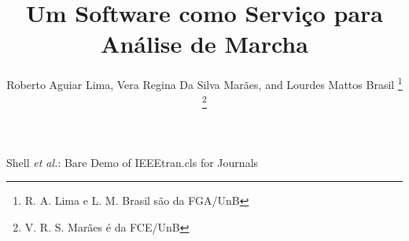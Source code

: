 \documentclass[journal]{IEEEtran}
\begin{document}
%
\title{Um Software como Serviço para Análise de Marcha}
%
%
%

\author{Roberto Aguiar Lima,
	Vera Regina Da Silva Marães,
        and Lourdes Mattos Brasil 
\thanks{R. A. Lima e L. M. Brasil são da FGA/UnB}%
\thanks{V. R. S. Marães é da FCE/UnB}}%

% 
%



%
{Shell \MakeLowercase{\textit{et al.}}: Bare Demo of IEEEtran.cls for Journals}
% 
\end{document}
